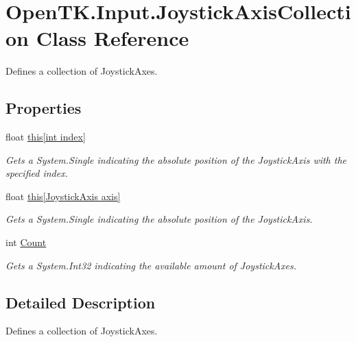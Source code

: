 \hypertarget{class_open_t_k_1_1_input_1_1_joystick_axis_collection}{\section{Open\-T\-K.\-Input.\-Joystick\-Axis\-Collection Class Reference}
\label{class_open_t_k_1_1_input_1_1_joystick_axis_collection}
}


Defines a collection of Joystick\-Axes.  


\subsection*{Properties}
\begin{DoxyCompactItemize}
\item 
float \hyperlink{class_open_t_k_1_1_input_1_1_joystick_axis_collection_a71e33c41bc7cb899a68883d205fbc98c}{this\mbox{[}int index\mbox{]}}
\begin{DoxyCompactList}\small\item\em Gets a System.\-Single indicating the absolute position of the Joystick\-Axis with the specified index. \end{DoxyCompactList}\item 
float \hyperlink{class_open_t_k_1_1_input_1_1_joystick_axis_collection_ab3bdbbfa5eb3a1fa18f3acefbc638247}{this\mbox{[}\-Joystick\-Axis axis\mbox{]}}
\begin{DoxyCompactList}\small\item\em Gets a System.\-Single indicating the absolute position of the Joystick\-Axis. \end{DoxyCompactList}\item 
int \hyperlink{class_open_t_k_1_1_input_1_1_joystick_axis_collection_a32a9980bbfb26d9672393aa41ea6f7c0}{Count}
\begin{DoxyCompactList}\small\item\em Gets a System.\-Int32 indicating the available amount of Joystick\-Axes. \end{DoxyCompactList}\end{DoxyCompactItemize}


\subsection{Detailed Description}
Defines a collection of Joystick\-Axes. 



